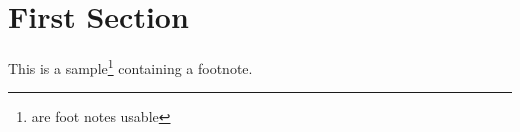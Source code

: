 \documentclass{article}
\begin{document}
\section{First {\bf Section}}

This is a sample\footnote{are foot notes usable} containing
a footnote.
\end{document}
